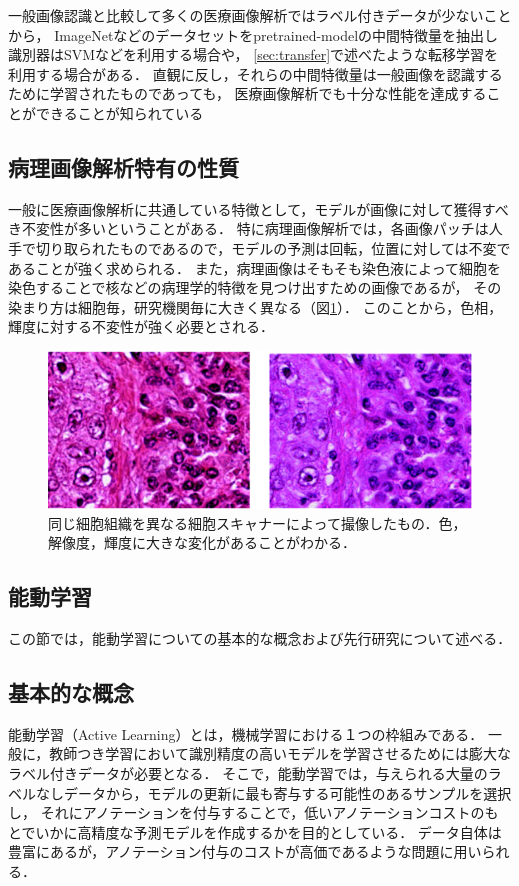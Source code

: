 一般画像認識と比較して多くの医療画像解析ではラベル付きデータが少ないことから，
ImageNetなどのデータセットをpretrained-modelの中間特徴量を抽出し識別器はSVMなどを利用する場合や，
\ref{sec:transfer}で述べたような転移学習を利用する場合がある．
直観に反し，それらの中間特徴量は一般画像を認識するために学習されたものであっても，
医療画像解析でも十分な性能を達成することができることが知られている\cite{li2014medical, tajbakhsh2016convolutional}

\subsection{病理画像解析特有の性質}
一般に医療画像解析に共通している特徴として，モデルが画像に対して獲得すべき不変性が多いということがある．
特に病理画像解析では，各画像パッチは人手で切り取られたものであるので，モデルの予測は回転，位置に対しては不変であることが強く求められる．
また，病理画像はそもそも染色液によって細胞を染色することで核などの病理学的特徴を見つけ出すための画像であるが，
その染まり方は細胞毎，研究機関毎に大きく異なる（図\ref{fig:comparison_color}）．
このことから，色相，輝度に対する不変性が強く必要とされる．

\begin{figure}[tbp]
     \begin{center}
      \includegraphics[width=13cm]{figures/comparison_color.pdf}
     \end{center}
    \caption{\label{fig:comparison_color}同じ細胞組織を異なる細胞スキャナーによって撮像したもの．色，解像度，輝度に大きな変化があることがわかる．}
\end{figure}

\subsection{能動学習}
\label{seq:al}
この節では，能動学習についての基本的な概念および先行研究について述べる．

\subsection{基本的な概念}
能動学習（Active Learning）\cite{settles2010active}とは，機械学習における１つの枠組みである．
一般に，教師つき学習において識別精度の高いモデルを学習させるためには膨大なラベル付きデータが必要となる．
そこで，能動学習では，与えられる大量のラベルなしデータから，モデルの更新に最も寄与する可能性のあるサンプルを選択し，
それにアノテーションを付与することで，低いアノテーションコストのもとでいかに高精度な予測モデルを作成するかを目的としている．
データ自体は豊富にあるが，アノテーション付与のコストが高価であるような問題に用いられる．

